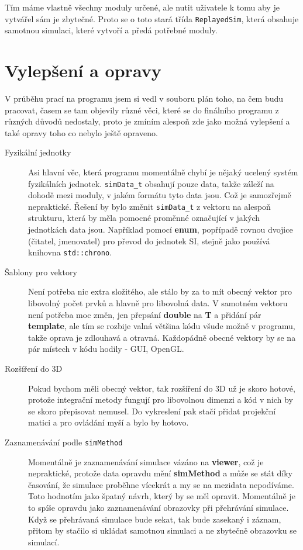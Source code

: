 Tím máme vlastně všechny moduly určené, ale nutit uživatele k tomu aby je vytvářel sám je zbytečné. Proto se o toto stará třída \texttt{ReplayedSim}, která obsahuje samotnou simulaci, které vytvoří a předá potřebné moduly.
\section{Vylepšení a opravy}
\label{sec:vylepseni}
V průběhu prací na programu jsem si vedl v souboru plán toho, na čem budu pracovat, časem se tam objevily různé věci, které se do finálního programu z různých důvodů nedostaly, proto je zmíním alespoň zde jako možná vylepšení a také opravy toho co nebylo ještě opraveno.

\begin{description}
	\item[Fyzikální jednotky] Asi hlavní věc, která programu momentálně chybí je nějaký ucelený systém fyzikálních jednotek. \texttt{simData\_t} obsahují pouze data, takže záleží na dohodě mezi moduly, v jakém formátu tyto data jsou. Což je samozřejmě nepraktické. Řešení by bylo změnit \texttt{simData\_t} z vektoru na alespoň strukturu, která by měla pomocné proměnné označující v jakých jednotkách data jsou. Například pomocí \textbf{enum}, popřípadě rovnou dvojice (čitatel, jmenovatel) pro převod do jednotek SI, stejně jako používá knihovna \texttt{std::chrono}.
	
	\item[Šablony pro vektory] Není potřeba nic extra složitého, ale stálo by za to mít obecný vektor pro libovolný počet prvků a hlavně pro libovolná data. V samotném vektoru není potřeba moc změn, jen přepsání \textbf{double} na \textbf{T} a přidání pár \textbf{template}, ale tím se rozbije valná většina kódu všude možně v programu, takže oprava je zdlouhavá a otravná.
	Každopádně obecné vektory by se na pár místech v kódu hodily - GUI, OpenGL.
	
	\item[Rozšíření do 3D] Pokud bychom měli obecný vektor, tak rozšíření do 3D už je skoro hotové, protože integrační metody fungují pro libovolnou dimenzi a kód v nich by se skoro přepisovat nemusel. Do vykreslení pak stačí přidat projekční matici a  pro ovládání myší a bylo by hotovo.
	
	\item[Zaznamenávání podle \texttt{simMethod}] Momentálně je zaznamenávání simulace vázáno na \textbf{viewer}, což je nepraktické, protože data opravdu mění \textbf{simMethod} a může se stát díky časování, že simulace proběhne vícekrát a my se na mezidata nepodíváme. Toto hodnotím jako špatný návrh, který by se měl opravit. Momentálně je to spíše opravdu jako zaznamenávání obrazovky při přehrávání simulace. Když se přehrávaná simulace bude sekat, tak bude zasekaný i záznam, přitom by stačilo si ukládat samotnou simulaci a ne zbytečně obrazovku se simulací.
	

\end{description}
